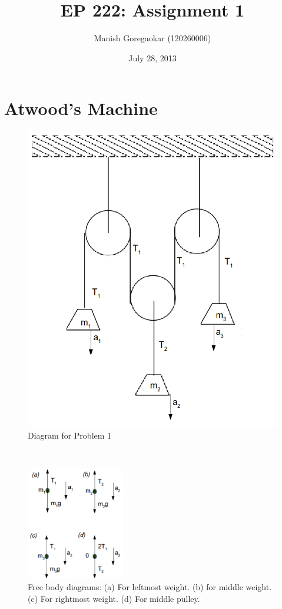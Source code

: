 \documentclass[12pt]{article}
\title{EP 222: Assignment 1}
\author{Manish Goregaokar (120260006)}
\date{July 28, 2013}
\begin{document}
\maketitle
\section{Atwood's Machine}
\begin{figure}[h]
\centering
\includegraphics[scale=0.3]{AtD}
\caption{Diagram for Problem 1}

\label{fig:atd}
\end{figure}
 ~\\
\begin{figure}
  \begin{center}
    \includegraphics[width=0.38\textwidth]{atFBDs}
  \end{center}
  
  \caption{\footnotesize Free body diagrams: (a) For leftmost weight. (b) for middle weight. (c) For rightmost weight. (d) For middle pulley.}
  \label{fig:atfbds}
\end{figure}
\end{document}

